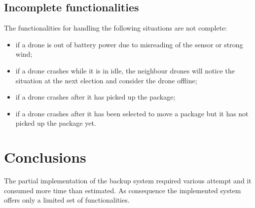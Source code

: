 \documentclass[a4paper, oneside]{memoir}
\begin{document}
\section{Incomplete functionalities}

The functionalities for handling the following situations are not complete:
\begin{itemize}
	\item if a drone is out of battery power due to misreading of the sensor or strong wind;
	\item if a drone crashes while it is in idle, the neighbour drones will notice the situation at the next election and consider the drone offline;
	\item if a drone crashes after it has picked up the package;
	\item if a drone crashes after it has been selected to move a package but it has not picked up the package yet.
\end{itemize}


\chapter{Conclusions}
The partial implementation of the backup system required various attempt and it consumed more time than estimated. As consequence the implemented system offers only a limited set of functionalities.
\end{document}
